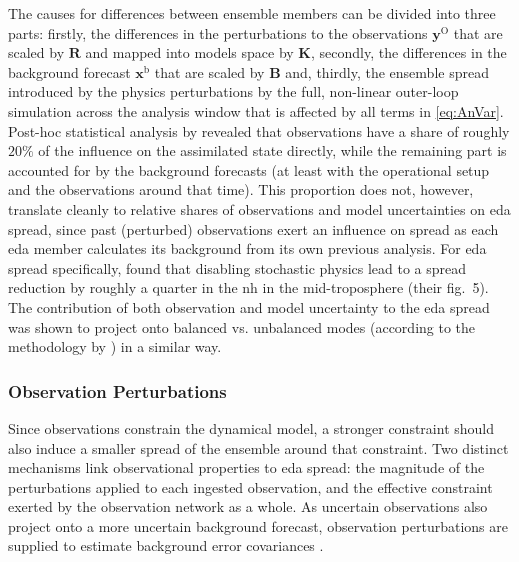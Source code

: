 The causes for differences between ensemble members can be divided into three parts: firstly, the differences in the perturbations to the observations $\mathbf{y}^{\mathrm{O}}$ that are scaled by $\mathbf{R}$ and mapped into models space by $\mathbf{K}$, secondly, the differences in the background forecast $\mathbf{x}^{\mathrm{b}}$ that are scaled by $\mathbf{B}$ and, thirdly, the ensemble spread introduced by the physics perturbations by the full, non-linear outer-loop simulation across the analysis window that is affected by all terms in \cref{eq:AnVar}. Post-hoc statistical analysis by \textcite{cardinaliObservationInfluenceDiagnostic2013} revealed that observations have a share of roughly $20\%$ of the influence on the assimilated state directly, while the remaining part is accounted for by the background forecasts (at least with the operational setup and the observations around that time). This proportion does not, however, translate cleanly to relative shares of observations and model uncertainties on \gls{eda} spread, since past (perturbed) observations exert an influence on spread as each \gls{eda} member calculates its background from its own previous analysis. For \gls{eda} spread specifically, \textcite{cardinaliRepresentingModelError2014} found that disabling stochastic physics lead to a spread reduction by roughly a quarter in the \gls{nh} in the mid-troposphere (their fig.~5). The contribution of both observation and model uncertainty to the \gls{eda} spread was shown to project onto balanced vs. unbalanced modes (according to the methodology by \textcite{zagarBalanceBackgrounderrorVariances2011}) in a similar way.

\subsubsection{Observation Perturbations}\label{sec:EDA_obs}
Since observations constrain the dynamical model, a stronger constraint should also induce a smaller spread of the ensemble around that constraint. Two distinct mechanisms link observational properties to \gls{eda} spread: the magnitude of the perturbations applied to each ingested observation, and the effective constraint exerted by the observation network as a whole. As uncertain observations also project onto a more uncertain background forecast, observation perturbations are supplied to estimate background error covariances \parencite{isaksenEnsembleDataAssimilations2010}.

